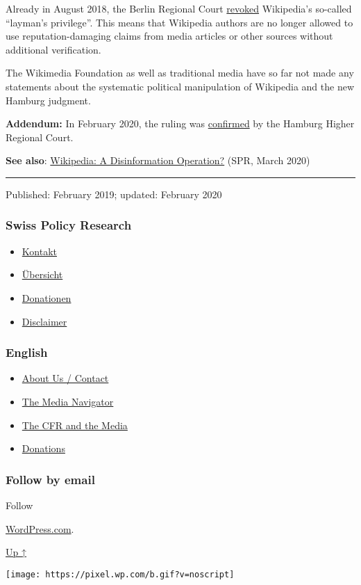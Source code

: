 Already in August 2018, the Berlin Regional Court
\href{https://www.heise.de/newsticker/meldung/Urteil-gegen-Wikipedia-Keine-rufschaedigende-Kritik-ohne-Recherche-4209610.html}{revoked}
Wikipedia's so-called ``layman's privilege''. This means that Wikipedia
authors are no longer allowed to use reputation-damaging claims from
media articles or other sources without additional verification.

The Wikimedia Foundation as well as traditional media have so far not
made any statements about the systematic political manipulation of
Wikipedia and the new Hamburg judgment.

\textbf{Addendum:} In February 2020, the ruling was
\href{https://kanzleikompa.de/2020/02/18/olg-hamburg-deanonymisierung-von-autoren-politischer-beitraege-zulaessig/}{confirmed}
by the Hamburg Higher Regional Court.

\textbf{See also}:
\href{https://swprs.org/wikipedia-disinformation-operation/}{Wikipedia:
A Disinformation Operation?} (SPR, March 2020)

\begin{center}\rule{0.5\linewidth}{\linethickness}\end{center}

Published: February 2019; updated: February 2020

\hypertarget{swiss-policy-research}{%
\subsubsection{Swiss Policy Research}\label{swiss-policy-research}}

\begin{itemize}
\tightlist
\item
  \href{https://swprs.org/kontakt/}{Kontakt}
\item
  \href{https://swprs.org/uebersicht/}{Übersicht}
\item
  \href{https://swprs.org/donationen/}{Donationen}
\item
  \href{https://swprs.org/disclaimer/}{Disclaimer}
\end{itemize}

\hypertarget{english}{%
\subsubsection{English}\label{english}}

\begin{itemize}
\tightlist
\item
  \href{https://swprs.org/contact/}{About Us / Contact}
\item
  \href{https://swprs.org/media-navigator/}{The Media Navigator}
\item
  \href{https://swprs.org/the-american-empire-and-its-media/}{The CFR
  and the Media}
\item
  \href{https://swprs.org/donations/}{Donations}
\end{itemize}

\hypertarget{follow-by-email}{%
\subsubsection{Follow by email}\label{follow-by-email}}

Follow

\href{https://wordpress.com/?ref=footer_custom_com}{WordPress.com}.

\protect\hyperlink{}{Up ↑}

\texttt{[image: https://pixel.wp.com/b.gif?v=noscript]}
